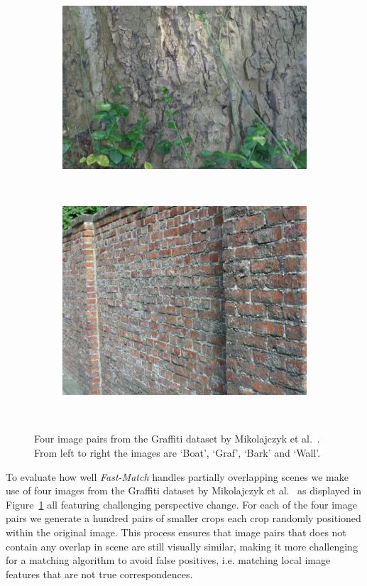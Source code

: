 \documentclass[10pt,twocolumn,letterpaper]{article}
\begin{document}
\begin{figure}[htb]
\begin{subfigure}[t]{0.24\columnwidth}
        \includegraphics[width=1\columnwidth]{images/acr/bark4}
    \end{subfigure}%
    ~ %
    \begin{subfigure}[t]{0.21\columnwidth}
        \centering
        \includegraphics[width=1\columnwidth]{images/acr/wall6}
    \end{subfigure}%
    ~
    \vspace{1.5 mm}

    \caption{Four image pairs from the Graffiti dataset by Mikolajczyk et al.\ \cite{mikolajczyk2005performance}. From left to right the images are `Boat', `Graf', `Bark' and `Wall'.}
    \label{fig:patch_objects}
\end{figure}
To evaluate how well \emph{Fast-Match} handles partially overlapping scenes we make use of four images from the Graffiti dataset by Mikolajczyk et al.\ \cite{mikolajczyk2005performance} as displayed in Figure\ \ref{fig:patch_objects} all featuring challenging perspective change. For each of the four image pairs we generate a hundred pairs of smaller crops each crop randomly positioned within the original image. This process ensures that image pairs that does not contain any overlap in scene are still visually similar, making it more challenging for a matching algorithm to avoid false positives, i.e. matching local image features that are not true correspondences.
\end{document}
